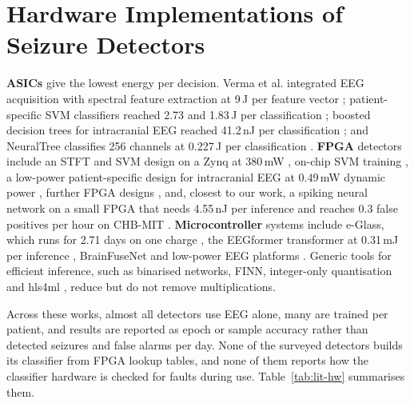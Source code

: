 \section{Hardware Implementations of Seizure Detectors}\label{sec:lit-hw}

\textbf{ASICs} give the lowest energy per decision. Verma et al. integrated EEG acquisition with spectral feature
extraction at 9\,\textmu J per feature vector \cite{verma2010micro}; patient-specific SVM classifiers reached
2.73 and 1.83\,\textmu J per classification \cite{altaf2015jssc,altaf2016tbcas}; boosted decision trees for
intracranial EEG reached 41.2\,nJ per classification \cite{shoaran2018jetcas}; and NeuralTree classifies 256 channels
at 0.227\,\textmu J per classification \cite{shin2022neuraltree}. \textbf{FPGA} detectors include an STFT and SVM
design on a Zynq at 380\,mW \cite{wang2018access}, on-chip SVM training \cite{elhosary2019tbcas}, a low-power
patient-specific design for intracranial EEG at 0.49\,mW dynamic power \cite{razi2022tbcas}, further FPGA designs
\cite{vittimberga2025sensors}, and, closest to our work, a spiking neural network on a small FPGA that needs 4.55\,nJ per
inference and reaches 0.3 false positives per hour on CHB-MIT \cite{busia2025fpga}. \textbf{Microcontroller} systems
include e-Glass, which runs for 2.71 days on one charge \cite{sopic2018eglass}, the EEGformer transformer at 0.31\,mJ
per inference \cite{busia2024eegformer}, BrainFuseNet \cite{ingolfsson2024brainfusenet} and low-power EEG platforms
\cite{kartsch2019biowolf,ingolfsson2022artifact}. Generic tools for efficient inference, such as binarised networks,
FINN, integer-only quantisation and hls4ml \cite{hubara2016bnn,umuroglu2017finn,jacob2018quant,duarte2018hls4ml},
reduce but do not remove multiplications.

Across these works, almost all detectors use EEG alone, many are trained per patient, and results are reported as
epoch or sample accuracy rather than detected seizures and false alarms per day. None of the surveyed detectors builds
its classifier from FPGA lookup tables, and none of them reports how the classifier hardware is checked for faults
during use. Table~\ref{tab:lit-hw} summarises them.

